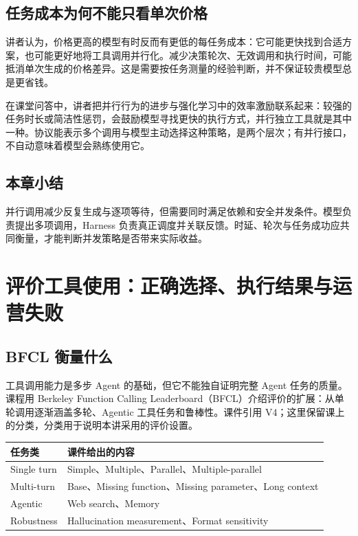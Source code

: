 \documentclass[11pt,a4paper]{article}
\begin{document}
\subsection{任务成本为何不能只看单次价格}
讲者认为，价格更高的模型有时反而有更低的每任务成本：它可能更快找到合适方案，也可能更好地将工具调用并行化。减少决策轮次、无效调用和执行时间，可能抵消单次生成的价格差异。这是需要按任务测量的经验判断，并不保证较贵模型总是更省钱。

在课堂问答中，讲者把并行行为的进步与强化学习中的效率激励联系起来：较强的任务时长或简洁性惩罚，会鼓励模型寻找更快的执行方式，并行独立工具就是其中一种。协议能表示多个调用与模型主动选择这种策略，是两个层次；有并行接口，不自动意味着模型会熟练使用它。

\subsection{本章小结}
并行调用减少反复生成与逐项等待，但需要同时满足依赖和安全并发条件。模型负责提出多项调用，Harness 负责真正调度并关联反馈。时延、轮次与任务成功应共同衡量，才能判断并发策略是否带来实际收益。

\clearpage
\section{评价工具使用：正确选择、执行结果与运营失败}
\subsection{BFCL 衡量什么}
工具调用能力是多步 Agent 的基础，但它不能独自证明完整 Agent 任务的质量。课程用 Berkeley Function Calling Leaderboard（BFCL）介绍评价的扩展：从单轮调用逐渐涵盖多轮、Agentic 工具任务和鲁棒性。课件引用 V4；这里保留课上的分类，分类用于说明本讲采用的评价设置。

\begin{center}\small\renewcommand{\arraystretch}{1.25}
\begin{tabularx}{\textwidth}{L{2.8cm} X}
\toprule
任务类 & 课件给出的内容\\
\midrule
Single turn & Simple、Multiple、Parallel、Multiple-parallel\\
Multi-turn & Base、Missing function、Missing parameter、Long context\\
Agentic & Web search、Memory\\
Robustness & Hallucination measurement、Format sensitivity\\
\bottomrule
\end{tabularx}\end{center}
\end{document}
